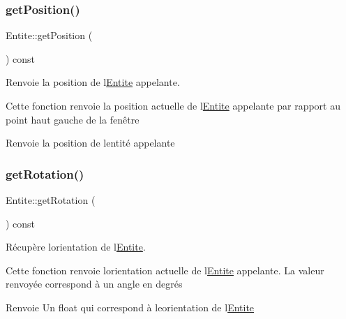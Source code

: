 \mbox{\label{class_entite_a6f6fd1e1f9f6ad44f0ecc74961a774d9}} 
\subsubsection{\texorpdfstring{get\+Position()}{getPosition()}}
{\footnotesize\ttfamily Entite\+::get\+Position (\begin{DoxyParamCaption}{ }\end{DoxyParamCaption}) const}



Renvoie la position de l\textquotesingle{}\hyperlink{class_entite}{Entite} appelante. 

Cette fonction renvoie la position actuelle de l\textquotesingle{}\hyperlink{class_entite}{Entite} appelante par rapport au point haut gauche de la fenêtre \begin{DoxyReturn}{Renvoie}
la position de l\textquotesingle{}entité appelante 
\end{DoxyReturn}
\mbox{\label{class_entite_a7f19439f7e7a5028f4b26eff21683de9}} 
\subsubsection{\texorpdfstring{get\+Rotation()}{getRotation()}}
{\footnotesize\ttfamily Entite\+::get\+Rotation (\begin{DoxyParamCaption}{ }\end{DoxyParamCaption}) const}



Récupère l\textquotesingle{}orientation de l\textquotesingle{}\hyperlink{class_entite}{Entite}. 

Cette fonction renvoie l\textquotesingle{}orientation actuelle de l\textquotesingle{}\hyperlink{class_entite}{Entite} appelante. La valeur renvoyée correspond à un angle en degrés \begin{DoxyReturn}{Renvoie}
Un {\ttfamily float} qui correspond à l\textquotesingle{}eorientation de l\textquotesingle{}\hyperlink{class_entite}{Entite} 
\end{DoxyReturn}
\mbox{\label{class_entite_a5f70868f62049291edf4b245a531a6e0}} 
